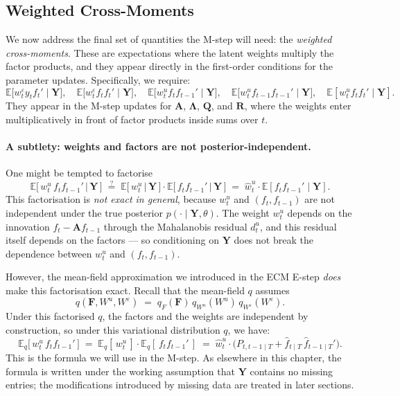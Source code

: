 \documentclass[11pt, a4paper, oneside]{article}
\newcommand{\mY}{\mathbf{Y}}
\newcommand{\mF}{\mathbf{F}}
\newcommand{\mL}{\boldsymbol{\Lambda}}
\newcommand{\mA}{\mathbf{A}}
\newcommand{\mR}{\mathbf{R}}
\newcommand{\mQ}{\mathbf{Q}}
\begin{document}
\subsection{Weighted Cross-Moments}
\label{subsec:weighted-cross-moments}

We now address the final set of quantities the M-step will need: the \emph{weighted cross-moments}. These are expectations where the latent weights multiply the factor products, and they appear directly in the first-order conditions for the parameter updates. Specifically, we require:
$$\mathbb{E}\big[w^\varepsilon_t y_t f_t' \mid \mY\big], \quad \mathbb{E}\big[w^\varepsilon_t f_t f_t' \mid \mY\big], \quad \mathbb{E}\big[w^u_t f_t f_{t-1}' \mid \mY\big], \quad \mathbb{E}\big[w^u_t f_{t-1} f_{t-1}' \mid \mY\big], \quad \mathbb{E}[w^u_t f_t f_t' \mid \mY].$$
They appear in the M-step updates for
$\mA$, $\mL$, $\mQ$, and $\mR$, where the weights enter
multiplicatively in front of factor products inside sums over $t$.

\paragraph{A subtlety: weights and factors are not posterior-independent.}
One might be tempted to factorise
\[
\mathbb{E}\!\big[\, w^u_t\, f_t f_{t-1}' \,\big|\, \mY\,\big]
\;\stackrel{?}{=}\;
\mathbb{E}\!\big[\, w^u_t \,\big|\, \mY\,\big] \cdot \mathbb{E}\!\big[\, f_t f_{t-1}' \,\big|\, \mY\,\big]
\;=\;
\hat{w}^u_t \cdot \mathbb{E}[f_t f_{t-1}' \mid \mY].
\]
This factorisation is \emph{not exact in general}, because $w^u_t$ and
$(f_t, f_{t-1})$ are not independent under the true posterior
$p(\cdot \mid \mY, \theta)$. The weight $w^u_t$ depends on the
innovation $f_t - \mA f_{t-1}$ through the Mahalanobis residual $d^u_t$,
and this residual itself depends on the factors — so conditioning on
$\mY$ does not break the dependence between $w^u_t$ and $(f_t, f_{t-1})$.

However, the mean-field approximation we introduced in the ECM E-step
\emph{does} make this factorisation exact. Recall that the mean-field
$q$ assumes
\[
q(\mF, W^u, W^\varepsilon) \;=\; q_F(\mF)\, q_{W^u}(W^u)\, q_{W^\varepsilon}(W^\varepsilon).
\]
Under this factorised $q$, the factors and the weights are independent
by construction, so under this variational distribution $q$, we have: 
\[
\mathbb{E}_q\!\big[\, w^u_t\, f_t f_{t-1}' \,\big]
\;=\;
\mathbb{E}_q[\, w^u_t \,] \cdot \mathbb{E}_q[\, f_t f_{t-1}' \,]
\;=\;
\hat{w}^u_t \cdot \big(P_{t, t-1 \mid T} + \hat{f}_{t \mid T}\, \hat{f}_{t-1 \mid T}'\big).
\]
This is the formula we will use in the M-step. As elsewhere in this
chapter, the formula is written under the working assumption that
$\mY$ contains no missing entries; the modifications introduced by
missing data are treated in later sections.
\end{document}
